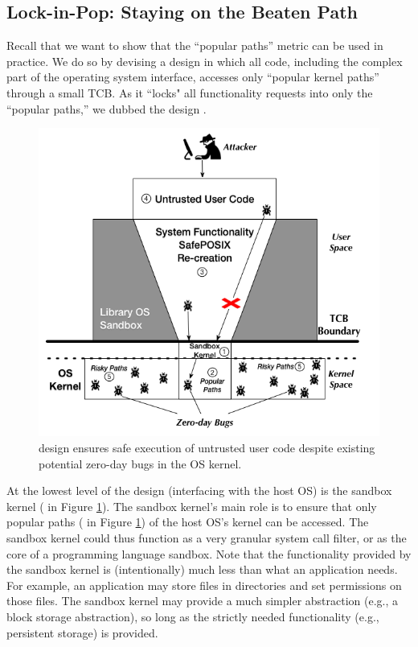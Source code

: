 \subsection{Lock-in-Pop: Staying on the Beaten Path}
\label{lock-in-pop}

Recall that we want to show that the ``popular paths'' metric can be used in practice.
We do so by devising a design
in which all code, including the complex part
of the operating system interface, accesses only
``popular kernel paths'' through a small TCB. As it ``locks" all functionality
requests into only the ``popular paths,'' we dubbed the design \lip.

\begin{figure}%
\centering
\includegraphics[width=1.0\columnwidth]{diagram/Virtualization_Design_Model_01.png}
\caption{\small \lip design ensures safe execution of untrusted user code
despite existing potential zero-day bugs in the OS kernel.}
\label{fig:design_safe_reimplementation}
\end{figure}

At the lowest level of the design (interfacing with the host OS) is the
sandbox kernel ( in Figure \ref{fig:design_safe_reimplementation}).
The sandbox kernel's main role is to ensure that only popular paths ( in Figure \ref{fig:design_safe_reimplementation})
of the host OS's kernel can be accessed.
The sandbox kernel could thus function as a very granular system call filter, or
as the core of a programming language sandbox. Note that the functionality
provided by the sandbox kernel is (intentionally) much less than what
an application needs. For example, an application may store files in directories and set permissions on those files.
The sandbox kernel may provide a much simpler abstraction (e.g., a block storage abstraction),
so long as the strictly needed functionality (e.g., persistent storage) is provided.

